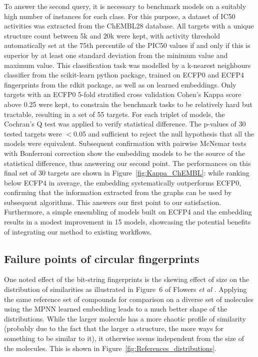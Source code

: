 \documentclass[doublespacing]{bmcart}
\begin{document}
To answer the second query, it is necessary to benchmark models on a suitably high number of instances for each class. For this purpose, a dataset of IC50 activities was extracted from the ChEMBL28 database. All targets with a unique structure count between 5k and 20k were kept, with activity threshold automatically set at the 75th percentile of the PIC50 values if and only if this is superior by at least one standard deviation from the minimum value and maximum value. This classification task was modelled by a k-nearest neighbours classifier from the scikit-learn python package\cite{scikit-learn}, trained on ECFP0 and ECFP4 fingerprints from the rdkit package\cite{LandrumRDKit}, as well as on learned embeddings. Only targets with an ECFP0 5-fold stratified cross validation Cohen's Kappa score above 0.25 were kept, to constrain the benchmark tasks to be relatively hard but tractable, resulting in a set of 55 targets. For each triplet of models, the Cochran's Q test was applied to verify statistical difference. The p-values of 30 tested targets were $<$0.05 and sufficient to reject the null hypothesis that all the models were equivalent. Subsequent confirmation with pairwise McNemar tests with Bonferroni correction show the embedding models to be the source of the statistical difference, thus answering our second point. The performances on this final set of 30 targets are shown in Figure~\ref{fig:Kappa_ChEMBL}: while ranking below ECFP4 in average, the embedding systematically outperforms ECFP0, confirming that the information extracted from the graphs can be used by subsequent algorithms. This answers our first point to our satisfaction. Furthermore, a simple ensembling of models built on ECFP4 and the embedding results in a modest improvement in 15 models, showcasing the potential benefits of integrating our method to existing workflows.



\subsection*{Failure points of circular fingerprints}

One noted effect of the bit-string fingerprints is the skewing effect of size on the distribution of similarities as illustrated in Figure~6 of Flowers \textit{et al} \cite{flower1998properties}. Applying the same reference set of compounds for comparison on a diverse set of molecules using the MPNN learned embedding leads to a much better shape of the distributions. While the larger molecule has a more chaotic profile of similarity (probably due to the fact that the larger a structure, the more ways for something to be similar to it), it otherwise seems  independent from the size of the molecules. This is shown in Figure~\ref{fig:References_distributions}.
\end{document}

